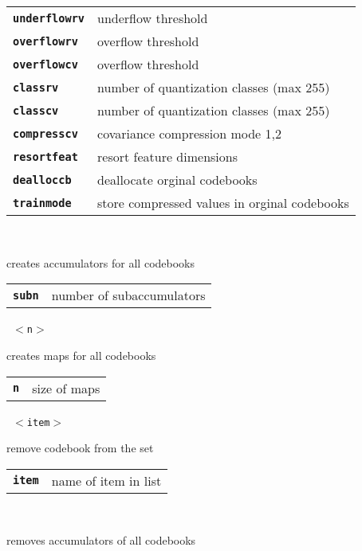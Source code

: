 \begin{description}
\begin{description}
      \begin{tabular}{ll}
 \texttt{\textbf{underflowrv}} &  underflow threshold  \\
 \texttt{\textbf{overflowrv}} &   overflow  threshold  \\
 \texttt{\textbf{overflowcv}} &   overflow  threshold  \\
 \texttt{\textbf{classrv}} &      number of quantization classes (max 255)  \\
 \texttt{\textbf{classcv}} &      number of quantization classes (max 255)  \\
 \texttt{\textbf{compresscv}} &   covariance compression mode  1,2  \\
 \texttt{\textbf{resortfeat}} &   resort feature dimensions  \\
 \texttt{\textbf{dealloccb}} &    deallocate orginal codebooks  \\
 \texttt{\textbf{trainmode}} &    store compressed values in orginal codebooks  \\
      \end{tabular}
       \texttt{ } \

        creates accumulators for all codebooks

      \begin{tabular}{ll}
 \texttt{\textbf{subn}} &  number of subaccumulators  \\
      \end{tabular}
       \texttt{ $<$n$>$} \

        creates maps for all codebooks

      \begin{tabular}{ll}
 \texttt{\textbf{n}} &   size of maps  \\
      \end{tabular}
       \texttt{ $<$item$>$} \

        remove codebook from the set

      \begin{tabular}{ll}
 \texttt{\textbf{item}} &  name of item in list  \\
      \end{tabular}
       \texttt{} \

        removes accumulators of all codebooks

       \texttt{} \


\end{description}
\end{description}
